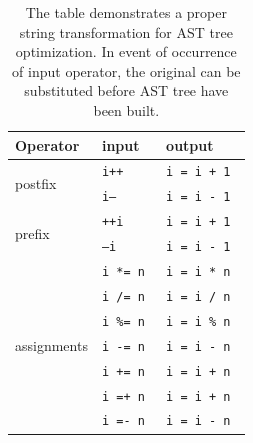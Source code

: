 \documentclass{report}
\begin{document}
\begin{table}[h]
\centering 
\begin{tabular}{|l|l|l|}
\hline
     Operator                        & input   & output     \\ \hline
\multirow{2}{*}{postfix}     & \texttt{i++}     & \texttt{i = i + 1  }  \\ \cline{2-3} 
                             & \texttt{i--}     & \texttt{i = i - 1  }  \\ \hline
\multirow{2}{*}{prefix}      & \texttt{++i}     & \texttt{i = i + 1 }   \\ \cline{2-3} 
                             & \texttt{--i }    & \texttt{i = i - 1}    \\ \hline
\multirow{7}{*}{assignments} & \texttt{i *= n } & \texttt{i = i * n } \\ \cline{2-3} 
                             & \texttt{i /= n  }& \texttt{i = i / n } \\ \cline{2-3} 
                             & \texttt{i \%= n }& \texttt{i = i \% n }\\ \cline{2-3} 
                             & \texttt{i -= n } & \texttt{i = i - n } \\ \cline{2-3} 
                             & \texttt{i += n  }& \texttt{i = i + n } \\ \cline{2-3} 
                             & \texttt{i =+ n } & \texttt{i = i + n}  \\ \cline{2-3} 
                             & \texttt{i =- n } & \texttt{i = i - n } \\ \hline
\end{tabular}
\caption[Possible combinations of statement substitution to create more similar trees]{The table demonstrates a proper string transformation for AST tree optimization. In event of occurrence  of input operator, the original can be substituted before AST tree have been built.}
\label{table:operators}
\end{table}
\end{document}
